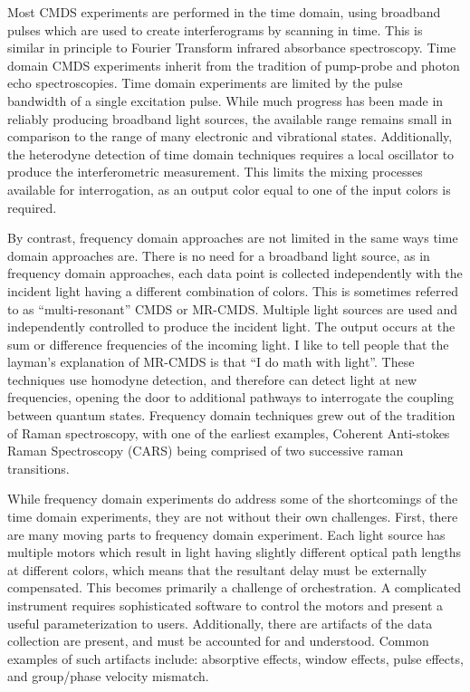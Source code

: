Most CMDS experiments are performed in the time domain, using broadband pulses which are used to create interferograms by scanning in time\cite{MukamelShaul2009a,GallagherSarahM1998a}.
This is similar in principle to Fourier Transform infrared absorbance spectroscopy.
Time domain CMDS experiments inherit from the tradition of pump-probe and photon echo spectroscopies\cite{Hybl_1998}.
Time domain experiments are limited by the pulse bandwidth of a single excitation pulse.
While much progress has been made in reliably producing broadband light sources\cite{KearnsNicholasM2017a}, the available range remains small in comparison to the range of many electronic and vibrational states.
Additionally, the heterodyne detection of time domain techniques requires a local oscillator to produce the interferometric measurement.
This limits the mixing processes available for interrogation, as an output color equal to one of the input colors is required.

By contrast, frequency domain approaches are not limited in the same ways time domain approaches are.
There is no need for a broadband light source, as in frequency domain approaches, each data point is collected independently with the incident light having a different combination of colors.
This is sometimes referred to as ``multi-resonant'' CMDS or MR-CMDS\cite{ThompsonBlaiseJonathan2018a}.
Multiple light sources are used and independently controlled to produce the incident light.
The output occurs at the sum or difference frequencies of the incoming light.
I like to tell people that the layman's explanation of MR-CMDS is that ``I do math with light''.
These techniques use homodyne detection, and therefore can detect light at new frequencies, opening the door to additional pathways to interrogate the coupling between quantum states.
Frequency domain techniques grew out of the tradition of Raman spectroscopy, with one of the earliest examples, Coherent Anti-stokes Raman Spectroscopy (CARS) being comprised of two successive raman transitions\cite{Tolles1977}.

While frequency domain experiments do address some of the shortcomings of the time domain experiments, they are not without their own challenges.
First, there are many moving parts to frequency domain experiment.
Each light source has multiple motors which result in light having slightly different optical path lengths at different colors, which means that the resultant delay must be externally compensated.
This becomes primarily a challenge of orchestration.
A complicated instrument requires sophisticated software to control the motors and present a useful parameterization to users.
Additionally, there are artifacts of the data collection are present, and must be accounted for and understood.
Common examples of such artifacts include: absorptive effects\cite{CarlsonRogerJ1989a}, window effects\cite{MurdochKiethM2000a,HandaliJonathanDaniel2018b}, pulse effects\cite{SpencerAustinP2015a}, and group/phase velocity mismatch\cite{MorrowDarienJames2017a}.

